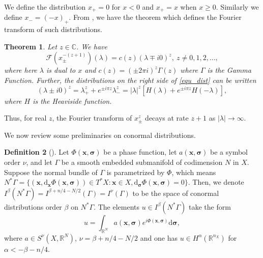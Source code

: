 \documentclass[a4paper,12pt]{amsart}
\numberwithin{equation}{section}
\theoremstyle{plain}
\newtheorem{theorem}{Theorem}
\numberwithin{theorem}{section}
\theoremstyle{definition}
\newtheorem{definition}[theorem]{Definition}
\theoremstyle{remark}
\theoremstyle{remark}
\theoremstyle{remark}
\newcommand{\tred}[1]{{\color{red}#1}}
\newcommand{\vx}{{\mathbf{x}}}
\newcommand{\vsig}{{\boldsymbol{\sigma}}} %
\newcommand{\jc}[1]{\begin{quotation}\textbf{James' comment:\
}{\textit{#1}}\end{quotation}}
\begin{document}
We define the distribution $x_+ = 0 $ for $x < 0$ and $x_+ = x$ when $x\geq 0$. Similarly we define $x_- = (-x)_+$. From \cite{franssens2014multiplication}, we have the theorem which defines the Fourier transform of such distributions.
\begin{theorem}
\label{thm_dist}
Let $z \in \mathbb{C}$. We have
\begin{equation}
\label{equ_dist}
\mathcal{F} (x_\pm^{-(z+1)})(\lambda) = c(z)(\lambda \mp i0)^z,\ z\not=0,1,2,\dots,
\end{equation}
where here $\lambda$ is dual to $x$ and $c(z) = (\pm 2\pi i )^z\Gamma(z)$ where $\Gamma$ is the Gamma Function. Further, the distributions on the right side of \eqref{equ_dist} can be written
$$(\lambda \pm i0)^z = \lambda_+^z + e^{\pm i\pi z } \lambda_-^z = |\lambda|^z[H(\lambda) + e^{\pm i\pi z } H(-\lambda)],$$
where $H$ is the Heaviside function. 
\end{theorem}
Thus, for real $z$, the Fourier transform of $x_\pm^{z}$ decays at rate $z+1$ as $|\lambda| \to \infty$.

\noindent We now review some preliminaries on conormal distributions.

\begin{definition}[\cite{palacios2018quantitative,greenleaf1993recovering}]
\label{def_conormal}
Let $\Phi(\vx,\vsig)$ be a phase function, let $a(\vx,\vsig)$ be a symbol order $\nu$, and let $\Gamma$ be a smooth embedded submanifold of codimension $N$ in $X$. Suppose the normal bundle of $\Gamma$ is parametrized by $\Phi$, which means $N^*\Gamma = \{(\vx, \mathrm{d}_\vx\Phi(\vx,\vsig)) \in T^* X : \vx \in X, \mathrm{d}_\vsig\Phi(\vx,\vsig) = 0\}$. Then, we denote $I^\beta(N^*\Gamma) = I^{\beta + n/4 -N/2}(\Gamma) = I^{\nu}(\Gamma)$ to be the space of conormal distributions order $\beta$ on $N^*\Gamma$. The elements $u \in I^\beta(N^*\Gamma)$  take the form
\begin{equation}
u = \int_{\mathbb{R}^N}a(\vx,\vsig) e^{i \Phi(\vx,\vsig)} \mathrm{d}\vsig,
\end{equation}
where $a \in S^\nu(X, \mathbb{R}^N)$, $\nu = \beta + n/4 -N/2$ and one has $u \in H^{\alpha}(\mathbb{R}^{n_X})$ for $\alpha < - \beta -n/4$.
\end{definition}
\end{document}
